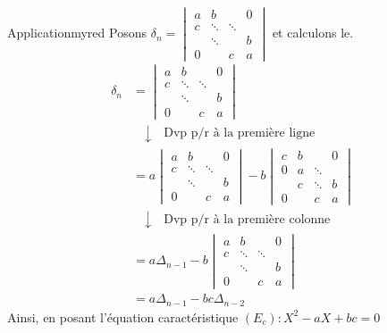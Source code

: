     \begin{omed}{Application}{myred}
        Posons $\delta_n = \begin{vmatrix}
            a & b & & 0 \\
            c & \ddots & \ddots & \\
            & \ddots & & b\\
            0 & & c & a
        \end{vmatrix}$ et calculons le.
        \begin{align*}
            \delta_n &= \begin{vmatrix}
                a & b & & 0 \\
                c & \ddots & \ddots & \\
                & \ddots & & b\\
                0 & & c & a
            \end{vmatrix} \\
            & \quad \downarrow \quad \text{Dvp p/r à la première ligne} \\
            &= a \begin{vmatrix}
                a & b & & 0 \\
                c & \ddots & \ddots & \\
                & \ddots & & b\\
                0 & & c & a
            \end{vmatrix} - b \begin{vmatrix}
                c & b & & 0 \\
                0 & a & \ddots & \\
                 & c & \ddots & b\\
                0 & & c & a
            \end{vmatrix} \\
            & \quad \downarrow \quad \text{Dvp p/r à la première colonne} \\
            &= a \Delta_{n-1} - b \begin{vmatrix}
                a & b & & 0 \\
                c & \ddots & \ddots & \\
                & \ddots & & b\\
                0 & & c & a
            \end{vmatrix} \\
            &= a \Delta_{n-1} - b c \Delta_{n-2}
        \end{align*} 
        Ainsi, en posant l’équation caractéristique $(E_c) : X^2 - aX + bc = 0$ \begin{itemize}

\end{itemize}
\end{omed}
